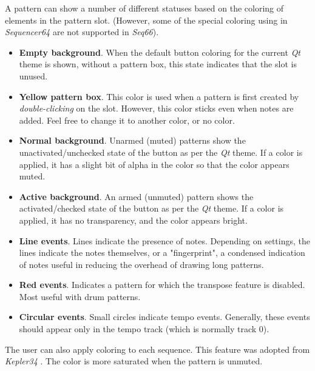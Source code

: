    A pattern can show a number of different statuses based on the coloring
   of elements in the pattern slot.
   (However, some of the special coloring using in
   \textsl{Sequencer64} are not supported in \textsl{Seq66}).

   \begin{itemize}
      \item \textbf{Empty background}.
         When the default button coloring for
         the current \textsl{Qt} theme is shown, without a pattern box,
         this state indicates that the slot is unused.
      \item \textbf{Yellow pattern box}.
         This color is used when a pattern is
         first created by \textsl{double-clicking} on the slot.
         However, this color sticks even when notes are added.
         Feel free to change it to another color, or no color.
      \item \textbf{Normal background}.
         Unarmed (muted) patterns show the
         unactivated/unchecked state of the button as per the \textsl{Qt}
         theme.  If a color is applied, it has a slight bit of alpha in the
         color so that the color appears muted.
      \item \textbf{Active background}.
         An armed (unmuted) pattern shows the
         activated/checked state of the button as per the \textsl{Qt}
         theme.  If a color is applied, it has no transparency, and the 
         color appears bright.
      \item \textbf{Line events}.
         Lines indicate the presence of notes.  Depending on settings, the
         lines indicate the notes themselves, or a "fingerprint", a condensed
         indication of notes useful in reducing the overhead of
         drawing long patterns.
      \item \textbf{Red events}.
         Indicates a pattern for which the transpose feature is
         disabled.  Most useful with drum patterns.
      \item \textbf{Circular events}.
         Small circles indicate tempo events.  Generally, these events should
         appear only in the tempo track (which is normally track 0).
   \end{itemize}

   The user can also apply coloring to each sequence.
   This feature was adopted from \textsl{Kepler34} \cite{kepler34}.
   The color is more saturated when the pattern is unmuted.

